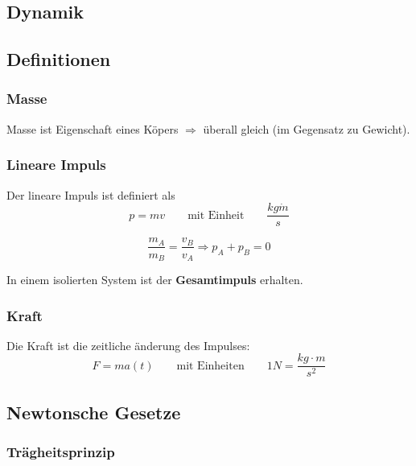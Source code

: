 \documentclass[7pt]{article}
\begin{document}
\begin{multicols*}{3}

\section{Dynamik}

\subsection{Definitionen}

\subsubsection{Masse}

Masse ist Eigenschaft eines K{\"o}pers $\Rightarrow$ {\"u}berall gleich (im Gegensatz zu Gewicht).

\subsubsection{Lineare Impuls}

Der lineare Impuls ist definiert als
\begin{equation*}
	p = mv \qquad\text{mit Einheit}\qquad \frac{kg\dot m}{s}
\end{equation*}

\begin{equation*}
	\frac{m_A}{m_B} = \frac{v_B}{v_A} \Rightarrow p_A + p_B = 0
\end{equation*}

In einem isolierten System ist der \textbf{Gesamtimpuls} erhalten.

\subsubsection{Kraft}

Die Kraft ist die zeitliche {\"a}nderung des Impulses:
\begin{equation*}
	F = ma(t) \qquad\text{mit Einheiten}\qquad 1N = \frac{kg\cdot m}{s^2}
\end{equation*}

\subsection{Newtonsche Gesetze}

\subsubsection{Tr{\"a}gheitsprinzip}


\end{multicols*}
\end{document}
